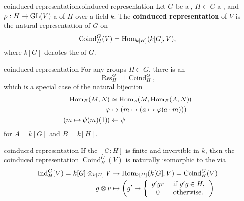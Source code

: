 \begin{topic}{coinduced-representation}{coinduced representation}
    Let $G$ be a , $H \subset G$ a , and $\rho : H \to \textup{GL}(V)$ a  of $H$ over a field $k$. The \textbf{coinduced representation} of $V$ is the natural representation of $G$ on
    \[ \operatorname{Coind}_H^G(V) = \operatorname{Hom}_{k[H]}(k[G], V) , \]
    where $k[G]$ denotes the  of $G$.
\end{topic}

\begin{example}{coinduced-representation}
    For any groups $H \subset G$, there is an 
    \[ \operatorname{Res}_H^G \dashv \operatorname{Coind}_H^G , \]
    which is a special case of the natural bijection
    \[ \begin{aligned}
        \operatorname{Hom}_B(M, N) &\simeq \operatorname{Hom}_A(M, \operatorname{Hom}_B(A, N)) \\
        \varphi &\mapsto (m \mapsto (a \mapsto \varphi(a \cdot m))) \\
        (m \mapsto \psi(m)(1)) &\mapsfrom \psi
    \end{aligned} \]
    for $A = k[G]$ and $B = k[H]$.
\end{example}

\begin{example}{coinduced-representation}
    If the  $[G : H]$ is finite and invertible in $k$, then the coinduced representation $\operatorname{Coind}_H^G(V)$ is naturally isomorphic to the  via
    \[ \begin{aligned}
        \operatorname{Ind}_H^G(V) = k[G] \otimes_{k[H]} V &\to \operatorname{Hom}_{k[H]}(k[G], V) = \operatorname{Coind}_H^G(V) \\
        g \otimes v &\mapsto \left(g' \mapsto \left\{ \begin{array}{cl} g'g v & \textup{ if } g'g \in H, \\ 0 & \textup{ otherwise}. \end{array} \right. \right)
    \end{aligned} \]
\end{example}
